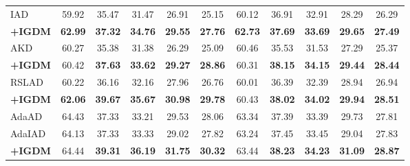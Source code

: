 \documentclass{article} %
\begin{document}
\begin{table}[h]
\begin{tabular}{lcccccccccc}
 IAD & 59.92 & 35.47  & 31.47 & 26.91 & 25.15& 60.12 & 36.91 & 32.91 & 28.29 & 26.29\\
 \textbf{+IGDM} & \textbf{62.99} & \textbf{37.32} & \textbf{34.76} & \textbf{29.55} & \textbf{27.76} & \textbf{62.73} & \textbf{37.69} & \textbf{33.69} & \textbf{29.65} & \textbf{27.49} \\
 \midrule
 AKD & 60.27 & 35.38 & 31.38 & 26.29 & 25.09 & 60.46 & 35.53 & 31.53& 27.29 & 25.37\\
 \textbf{+IGDM} & 60.42 & \textbf{37.63} & \textbf{33.62} & \textbf{29.27} & \textbf{28.86} & 60.31& \textbf{38.15} & \textbf{34.15}& \textbf{29.44} & \textbf{28.44}\\
 \midrule
 RSLAD & 60.22 & 36.16 & 32.16 & 27.96 &26.76 & 60.01 & 36.39 & 32.39 & 28.94 & 26.94 \\
 \textbf{+IGDM} & \textbf{62.06} & \textbf{39.67} & \textbf{35.67} & \textbf{30.98} & \textbf{29.78} & 60.43 & \textbf{38.02} & \textbf{34.02} & \textbf{29.94} & \textbf{28.51} \\
 \midrule
 AdaAD &64.43 & 37.33 & 33.21 & 29.53 & 28.06& 63.34 & 37.39 & 33.39 & 29.73 & 27.81\\
 AdaIAD & 64.13& 37.33 & 33.33& 29.02 & 27.82 & 63.24 & 37.45 & 33.45 & 29.04 & 27.83\\
 \textbf{+IGDM} & 64.44& \textbf{39.31} & \textbf{36.19} & \textbf{31.75} & \textbf{30.32} & 63.44 & \textbf{38.23} & \textbf{34.23} & \textbf{31.09} & \textbf{28.87} \\
\bottomrule
 \end{tabular}
 \label{tab:main_resnet_cifar100}
\end{table}
\end{document}
